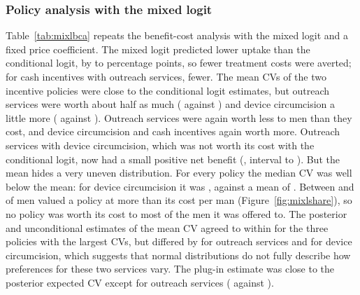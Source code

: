\documentclass[11pt]{article}
\numberwithin{equation}{section}\numberwithin{figure}{section}\numberwithin{table}{section}
\begin{document}
\subsubsection{Policy analysis with the mixed logit}
Table~\ref{tab:mixlbca} repeats the benefit-cost analysis with the mixed logit and a fixed price coefficient. The mixed logit predicted lower uptake than the conditional logit, by \mmcMXuptakeDiffMin{} to \mmcMXuptakeDiffMax{} percentage points, so fewer treatment costs were averted; for cash incentives with outreach services, \mmcMXtxDrop{} fewer. The mean CVs of the two incentive policies were close to the conditional logit estimates, but outreach services were worth about half as much (\mmcMXPOneCV{} against \mmcPOneCV) and device circumcision a little more (\mmcMXPTwoCV{} against \mmcPTwoCV). Outreach services were again worth less to men than they cost, and device circumcision and cash incentives again worth more. Outreach services with device circumcision, which was not worth its cost with the conditional logit, now had a small positive net benefit (\mmcMXPThreeNB, interval \mmcMXPThreeNBlo{} to \mmcMXPThreeNBhi). But the mean hides a very uneven distribution. For every policy the median CV was well below the mean: for device circumcision it was \mmcMXPTwoCVmed, against a mean of \mmcMXPTwoCV. Between \mmcMXgainMin{} and \mmcMXgainMax{} of men valued a policy at more than its cost per man (Figure~\ref{fig:mixlshare}), so no policy was worth its cost to most of the men it was offered to. The posterior and unconditional estimates of the mean CV agreed to within \mmcMXpopDiffRest{} for the three policies with the largest CVs, but differed by \mmcMXpopDiffOne{} for outreach services and \mmcMXpopDiffTwo{} for device circumcision, which suggests that normal distributions do not fully describe how preferences for these two services vary. The plug-in estimate was close to the posterior expected CV except for outreach services (\mmcMXPOnePlugFixed{} against \mmcMXPOneCV).

\begin{table}[!htbp]
\centering
\caption{Mixed logit with a fixed price coefficient: uptake, compensating variation, incremental cost and net benefit per uncircumcised man (2017 US\$), averaged over the conditional distributions of the 406 men. 95\% Krinsky-Robb intervals in brackets.}\label{tab:mixlbca}
\small
{}
\end{table}
\end{document}
